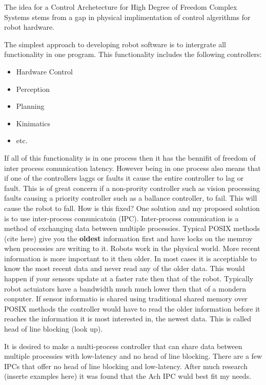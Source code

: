 The idea for a Control Archetecture for High Degree of Freedom Complex Systems stems from a gap in physical implimentation of control algerithms for robot hardware.

The simplest approach to developing robot software is to intergrate all functionality in one program.  
This functionality includes the following controllers:
\begin{itemize}
\item Hardware Control
\item Perception
\item Planning
\item Kinimatics
\item etc.
\end{itemize}

If all of this functionality is in one process then it has the bennifit of freedom of inter process comunication latency.
However being in one process also means that if one of the controllers laggs or faults it cause the entire controller to lag or fault.
This is of great concern if a non-prority controller such as vision processing faults causing a priority controller such as a ballance controller, to fail.
This will cause the robot to fall.
How is this fixed?
One solution and my proposed solution is to use inter-process comunicatoin (IPC).
Inter-process comunication is a method of exchanging data between multiple processies.
Typical POSIX methods (cite here) give you the \textbf{oldest} information first and have locks on the memroy when processies are writing to it.
Robots work in the physical world. 
More recent information is more important to it then older.
In most cases it is acceptiable to know the most recent data and never read any of the older data.
This would happen if your sensors update at a faster rate then that of the robot.
Typically robot actuiators have a bandwidth much much lower then that of a mondern conputer.
If sensor informatio is shared using traditional shared memory over POSIX methods the controller would have to read the older information before it reaches the information it is most interested in, the newest data.
This is called head of line blocking (look up).

It is desired to make a multi-process controller that can share data between multiple processies with low-latency and no head of line blocking.
There are a few IPCs that offer no head of line blocking and low-latency.  
After much research (inserte examples here) it was found that the Ach IPC wuld best fit my needs.


